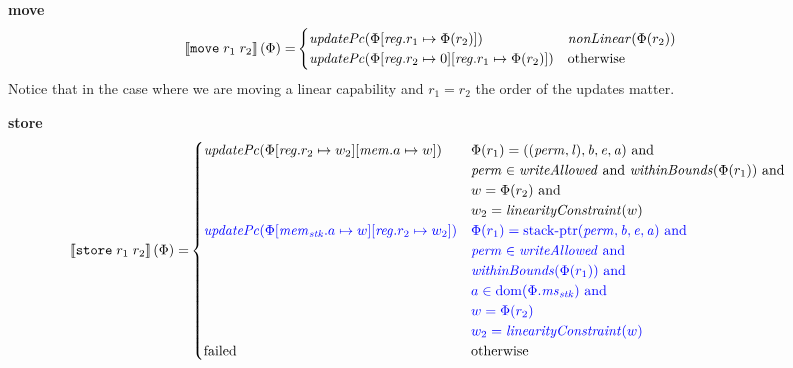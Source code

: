 \documentclass[a4paper]{article}
\newcommand{\sem}[1]{\left\llbracket #1 \right\rrbracket}
\newcommand{\dom}{\mathrm{dom}}
\newcommand{\tand}{\text{ and }}
\newcommand{\totherwise}{\text{otherwise }}
\newcommand{\sourcecolor}[1]{\color{blue}}
\newcommand{\src}[1]{{\sourcecolor{} #1}}
\newcommand{\targetcolor}[1]{\color{black}}
\newcommand{\trg}[1]{{\targetcolor{} #1}}
\newcommand{\zinstr}[1]{\texttt{#1}}
\newcommand{\twoinstr}[3]{
  \ifthenelse{\equal{#2#3}{}}
  {\zinstr{#1}}
  {\zinstr{#1} \; #2 \; #3}
}
\newcommand{\tmove}[2]{\twoinstr{\trg{move}}{#1}{#2}}
\newcommand{\tstore}[2]{\twoinstr{\trg{store}}{#1}{#2}}
\newcommand{\update}[2]{[#1 \mapsto #2]}
\newcommand{\updReg}[2]{\update{\reg.#1}{#2}}
\newcommand{\perm}{\var{perm}}
\newcommand{\lin}{\var{l}}
\newcommand{\stkptr}[1]{\mathrm{stack\text{-}ptr}(#1)}
\newcommand{\failed}{\mathrm{failed}}
\newcommand{\var}[1]{\mathit{#1}}
\newcommand{\reg}{\var{reg}}
\newcommand{\mem}{\var{mem}}
\newcommand{\ms}{\var{ms}}
\newcommand{\stk}{\var{stk}}
\newcommand{\baddr}{\var{b}}
\newcommand{\eaddr}{\var{e}}
\newcommand{\aaddr}{\var{a}}
\newcommand{\plainfun}[2]{
  \ifthenelse{\equal{#2}{}}
  {\mathit{#1}}
  {\mathit{#1}(#2)}
}
\newcommand{\updPcAddr}[1]{\plainfun{updatePc}{#1}}
\newcommand{\writeAllowed}[1]{\plainfun{writeAllowed}{#1}}
\newcommand{\nonLinear}[1]{\plainfun{nonLinear}{#1}}
\newcommand{\linCons}[1]{\plainfun{linearityConstraint}{#1}}
\newcommand{\withinBounds}[1]{\plainfun{withinBounds}{#1}}
\begin{document}
\noindent\textbf{move}\\
\begin{align*}
  \sem{\tmove{r_1}{r_2}}(\Phi) = & 
                              \begin{cases}
                                \updPcAddr{\Phi\updReg{r_1}{\Phi(r_2)}} & \nonLinear{\Phi(r_2)}\\
                                \updPcAddr{\Phi\updReg{r_2}{0}\updReg{r_1}{\Phi(r_2)}} & \totherwise 
                              \end{cases}
\end{align*}
Notice that in the case where we are moving a linear capability and $r_1 = r_2$ the order of the updates matter.

\noindent\textbf{store}\\
\begin{align*}
  \sem{\tstore{r_1}{r_2}}(\Phi) = &
                                    \begin{cases}
                                      \updPcAddr{\Phi\updReg{r_2}{w_2}\update{\mem.a}{w}} & 
                                      \arraycolsep=0pt
                                      \begin{array}[t]{l}
                                        \Phi(r_1) = ((\perm,\lin),\baddr,\eaddr,\aaddr) \tand \\
                                        \perm \in \writeAllowed{} \tand \withinBounds{\Phi(r_1)} \tand \\
                                        w = \Phi(r_2) \tand \\
                                        w_2 = \linCons{w}
                                      \end{array}
                                      \\
                                      \src{\updPcAddr{\Phi\update{\mem_\stk.a}{w}\updReg{r_2}{w_2}}} & 
                                      \arraycolsep=0pt
                                      \begin{array}[t]{l}
                                        \src{\Phi(r_1) = \stkptr{\perm,\baddr,\eaddr,\aaddr} \tand} \\
                                        \src{\perm \in \writeAllowed{} \tand} \\
                                        \src{\withinBounds{\Phi(r_1)} \tand} \\
                                        \src{a \in \dom(\Phi.\ms_\stk) \tand} \\
                                        \src{w = \Phi(r_2)} \\
                                        \src{w_2 = \linCons{w}}
                                      \end{array}\\
                                      \failed & \totherwise
                                    \end{cases}
\end{align*}
\end{document}
